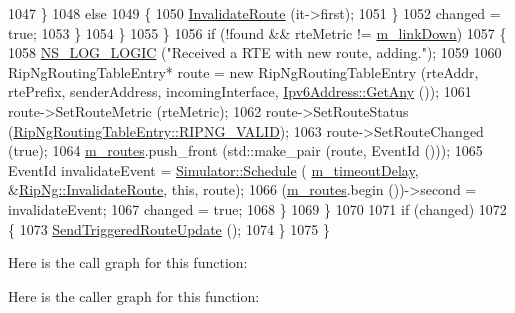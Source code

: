 \begin{DoxyCode}
1047                     \}
1048                   \textcolor{keywordflow}{else}
1049                     \{
1050                       \hyperlink{classns3_1_1RipNg_ae4fc1ca9ed948f3c028fd96fb016f7dd}{InvalidateRoute} (it->first);
1051                     \}
1052                   changed = \textcolor{keyword}{true};
1053                 \}
1054             \}
1055         \}
1056       \textcolor{keywordflow}{if} (!found && rteMetric != \hyperlink{classns3_1_1RipNg_a6752c1bb1fc0909f0493033d426f2b92}{m\_linkDown})
1057         \{
1058           \hyperlink{group__logging_ga88acd260151caf2db9c0fc84997f45ce}{NS\_LOG\_LOGIC} (\textcolor{stringliteral}{"Received a RTE with new route, adding."});
1059 
1060           RipNgRoutingTableEntry* route = \textcolor{keyword}{new} RipNgRoutingTableEntry (rteAddr, rtePrefix, senderAddress, 
      incomingInterface, \hyperlink{classns3_1_1Ipv6Address_a2783e8badfc98c8b0a8508bba6e1b91e}{Ipv6Address::GetAny} ());
1061           route->SetRouteMetric (rteMetric);
1062           route->SetRouteStatus (\hyperlink{classns3_1_1RipNgRoutingTableEntry_af723fc23e97afdd05c55da5162b7e673a334e33ca88fb2b8de53c814814d3c017}{RipNgRoutingTableEntry::RIPNG\_VALID});
1063           route->SetRouteChanged (\textcolor{keyword}{true});
1064           \hyperlink{classns3_1_1RipNg_acfc1011b140f9e612a8c27c9bfb4c6b5}{m\_routes}.push\_front (std::make\_pair (route, EventId ()));
1065           EventId invalidateEvent = \hyperlink{classns3_1_1Simulator_a671882c894a08af4a5e91181bf1eec13}{Simulator::Schedule} (
      \hyperlink{classns3_1_1RipNg_aed45845b278332b589e76304a3701d72}{m\_timeoutDelay}, &\hyperlink{classns3_1_1RipNg_ae4fc1ca9ed948f3c028fd96fb016f7dd}{RipNg::InvalidateRoute}, \textcolor{keyword}{this}, route);
1066           (\hyperlink{classns3_1_1RipNg_acfc1011b140f9e612a8c27c9bfb4c6b5}{m\_routes}.begin ())->second = invalidateEvent;
1067           changed = \textcolor{keyword}{true};
1068         \}
1069     \}
1070 
1071   \textcolor{keywordflow}{if} (changed)
1072     \{
1073       \hyperlink{classns3_1_1RipNg_ad7a8e445116b3dd8cdd1d50366787c66}{SendTriggeredRouteUpdate} ();
1074     \}
1075 \}
\end{DoxyCode}


Here is the call graph for this function\+:




Here is the caller graph for this function\+:


